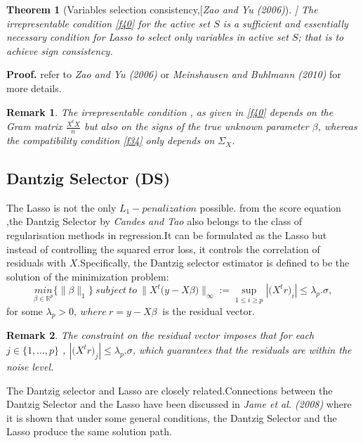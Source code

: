 \documentclass[12pt]{report}
\newtheorem{theoreme}{Theorem}[section] %
\newtheorem{remarque}{Remark}[section]
\begin{document}
\begin{theoreme}[Variables selection consistency,[\textit{Zao and Yu (2006)}]]
	The irrepresentable condition \eqref{f40} for the active set $S$ is a sufficient and essentially necessary condition for Lasso to select only variables in active set $S$; that is to achieve sign consistency.
\end{theoreme}
\textbf{Proof.} refer to \textit{Zao and Yu (2006) \cite{nref15}} or \textit{Meinshausen and Buhlmann (2010)} for more details.

\begin{remarque}
	The irrepresentable condition , as given in \eqref{f40} depends on the Gram matrix $\frac{X^{t}X}{n}$ but also on the signs of the true unknown parameter $\beta$, whereas the compatibility condition \eqref{f34} only depends on $\Sigma_{X}$.
\end{remarque}

	\subsection{Dantzig Selector (DS)}
The Lasso is not the only $L_{1}-penalization$ possible. from the score equation ,the Dantzig Selector by \textit{Candes and Tao \cite{nref12}} also belongs to the class of regularisation methods in regression.It can be formulated as the Lasso but instead of controlling the squared error loss, it controls the correlation of residuals with $X$.Specifically, the Dantzig selector estimator is defined to be the solution of the minimization problem:
\begin{equation}
	\underset{\beta\in \mathbb{R}^{p}}{min} \big\{\parallel \beta\parallel_{1}\big\}\ subject\ to\ \parallel X^{t}\big(y-X\beta\big) \parallel_{\infty}:=\underset{1\leq i \geq p}{\sup}|\big(X^{t}r\big)_{i}|\leq \lambda_{p}.\sigma,
	\label{f41}
\end{equation}
for some $\lambda_{p}>0,\ where\ r=y-X\beta\ $ is the residual vector.

\begin{remarque}
	The constraint on the residual vector imposes that for each $j\in \{1,\dots, p\}$ , $|\big(X^{t}r\big)_{j}|\leq \lambda_{p}.\sigma$, which guarantees that the residuals are within the noise level.
\end{remarque}

The Dantzig selector and Lasso are closely related.Connections between the Dantzig Selector and the Lasso have been discussed in \textit{Jame et al. (2008)} where it is shown that under some general conditions, the Dantzig Selector and the Lasso produce the same solution path.
\end{document}
